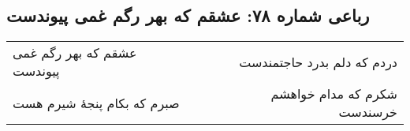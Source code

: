\begin{center}
\section*{رباعی شماره ۷۸: عشقم که بهر رگم غمی پیوندست}
\label{sec:sh078}
\begin{longtable}{l p{0.5cm} r}
عشقم که بهر رگم غمی پیوندست
&&
دردم که دلم بدرد حاجتمندست
\\
صبرم که بکام پنجهٔ شیرم هست
&&
شکرم که مدام خواهشم خرسندست
\\
\end{longtable}
\end{center}
